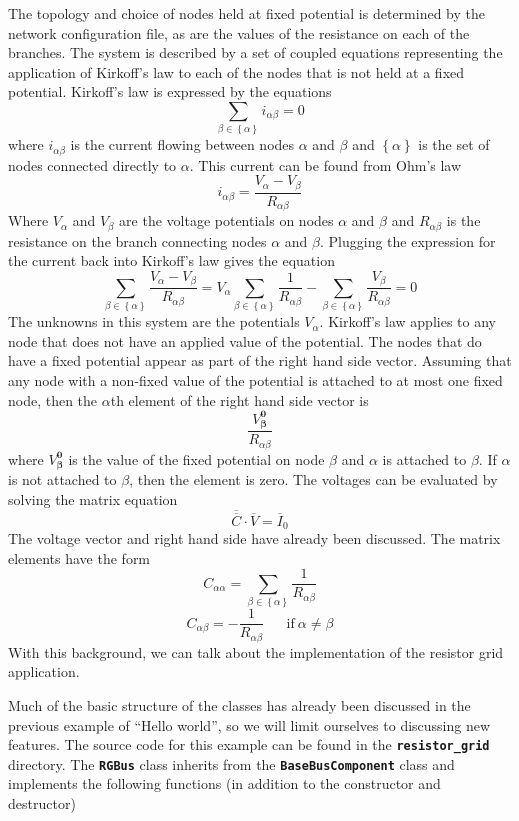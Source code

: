 The topology and choice of nodes held at fixed potential is determined by the network configuration file, as are the values of the resistance on each of the branches. The system is described by a set of coupled equations representing the application of Kirkoff's law to each of the nodes that is not held at a fixed potential. Kirkoff's law is expressed by the equations\[\sum_{\beta \in \left\{\alpha \right\}}{i_{\alpha \beta }=0}\] 
where $i_{\alpha \beta }$ is the current flowing between nodes $\alpha $ and $\beta $ and $\left\{\alpha \right\}$ is the set of nodes connected directly to $\alpha $. This current can be found from Ohm's law
\[i_{\alpha \beta }=\frac{V_{\alpha }-V_{\beta }}{R_{\alpha \beta }}\] 
Where $V_{\alpha }$ and $V_{\beta }$ are the voltage potentials on nodes $\alpha $ and $\beta $ and $R_{\alpha \beta }$ is the resistance on the branch connecting nodes $\alpha $ and $\beta $. Plugging the expression for the current back into Kirkoff's law gives the equation
\[\sum_{\beta \in \left\{\alpha \right\}}{\frac{V_{\alpha }-V_{\beta }}{R_{\alpha \beta }}=V_{\alpha }\sum_{\beta \in \left\{\alpha \right\}}{\frac{1}{R_{\alpha \beta }}}-\sum_{\beta \in \left\{\alpha \right\}}{\frac{V_{\beta }}{R_{\alpha \beta }}}=0}\] 
The unknowns in this system are the potentials $V_{\alpha }$. Kirkoff's law applies to any node that does not have an applied value of the potential. The nodes that do have a fixed potential appear as part of the right hand side vector. Assuming that any node with a non-fixed value of the potential is attached to at most one fixed node, then the $\alpha $th element of the right hand side vector is
\[\frac{V^{\boldsymbol{0}}_{\boldsymbol{\beta }}}{R_{\alpha \beta }}\] 
where $V^{\boldsymbol{0}}_{\boldsymbol{\beta }}$ is the value of the fixed potential on node $\beta $ and $\alpha $ is attached to $\beta $. If $\alpha $ is not attached to $\beta $, then the element is zero. The voltages can be evaluated by solving the matrix equation
\[\overline{\overline{C}}\cdot \overline{V}={\overline{I}}_0\] 
The voltage vector and right hand side have already been discussed. The matrix elements have the form
\[
C_{\alpha \alpha }=\sum_{\beta \in \left\{\alpha \right\}}{\frac{1}{R_{\alpha \beta }}}
\]
\[
C_{\alpha \beta }=-\frac{1}{R_{\alpha \beta }}\ \mathrm{\;\;\;\;\;if}\ \alpha \neq \beta
\] 
With this background, we can talk about the implementation of the resistor grid application.

Much of the basic structure of the classes has already been discussed in the previous example of ``Hello world'', so we will limit ourselves to discussing new features. The source code for this example can be found in the \texttt{\textbf{resistor\_grid}} directory. The \texttt{\textbf{RGBus}} class inherits from the \texttt{\textbf{BaseBusComponent}} class and implements the following functions (in addition to the constructor and destructor)

